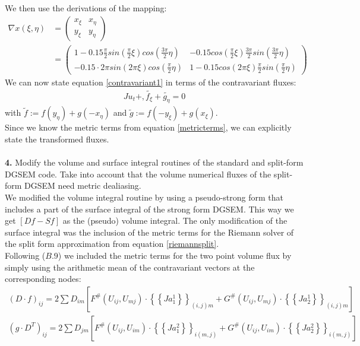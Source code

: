 \documentclass[11pt]{scrartcl}
\begin{document}
We then use the derivations of the mapping:
\begin{align}
\nabla x(\xi, \eta) &= 
\begin{pmatrix}
x_\xi & x_\eta\\
y_\xi & y_\eta
\end{pmatrix} \nonumber \\ &=
\begin{pmatrix}
1 - 0.15 \frac{\pi}{2} sin(\frac{\pi}{2}\xi) cos(\frac{3\pi}{2} \eta) &
- 0.15 cos(\frac{\pi}{2}\xi) \frac{3\pi}{2} sin(\frac{3\pi}{2} \eta) \\
- 0.15 \cdot 2\pi sin(2\pi\xi) cos(\frac{\pi}{2} \eta) &
1 - 0.15 cos(2\pi \xi) \frac{\pi}{2}  sin(\frac{\pi}{2} \eta)
\end{pmatrix}
\label{metricterms}
\end{align}
We can now state equation \ref{contravariant1} in terms of the contravariant fluxes:
\begin{align}
 J u_t + ,\tilde{f_\xi} + \tilde{g_\eta} = 0
 \label{contravariantequation}
\end{align}
with $\tilde{f} := f(y_\eta) + g(-x_\eta)$ and $\tilde{g} := f(-y_\xi) + g(x_\xi)$.
\\Since we know the metric terms from equation \ref{metricterms}, we can explicitly state the transformed fluxes. \\ \ \\
\textbf{4.} Modify the volume and surface integral routines of the standard and split-form DGSEM code. Take into account that the volume numerical fluxes of the split-form DGSEM need metric dealiasing.\\

We modified the volume integral routine by using a pseudo-strong form that includes a part of the surface integral of the strong form DGSEM. This way we get $[Df - Sf]$ as the (pseudo) volume integral. The only modification of the surface integral was the inclusion of the metric terms for the Riemann solver of the split form approximation from equation \ref{riemannsplit}. \\
Following \cite{Gassner_2016} ($B.9$) we included the metric terms for the two point volume flux by simply using the arithmetic mean of the contravariant vectors at the corresponding nodes:
\begin{align*}
(D \cdot f)_{ij} = 2 \sum D_{im} \left[ F^{\#}(U_{ij}, U_{mj}) \cdot \left\{\left\{ Ja^1_1 \right\}\right\}_{(i,j)m} + G^{\#}(U_{ij}, U_{mj}) \cdot \left\{\left\{ Ja^1_2 \right\}\right\}_{(i,j)m} \right] \\
(g \cdot D^T)_{ij} = 2 \sum D_{jm} \left[ F^{\#}(U_{ij}, U_{im}) \cdot \left\{\left\{ Ja^2_1 \right\}\right\}_{i(m,j)} + G^{\#}(U_{ij}, U_{im}) \cdot \left\{\left\{ Ja^2_2 \right\}\right\}_{i(m,j)} \right]
\end{align*}
\end{document}
